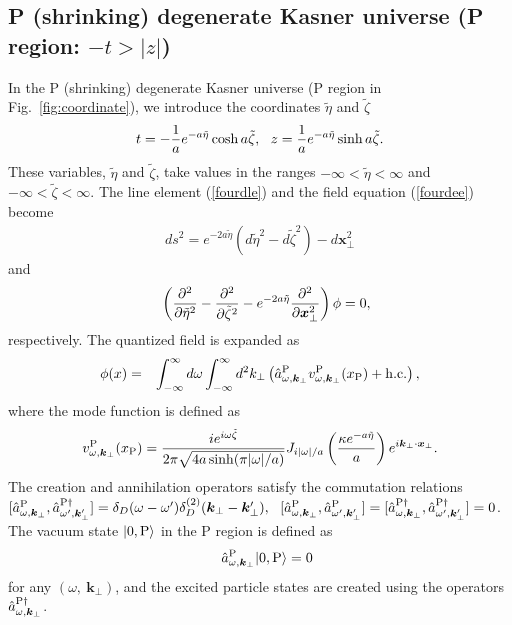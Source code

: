 \documentclass[aps,prd,preprintnumbers,nofootinbib,showpacs,11pt]{revtex4}%
\begin{document}
\begin{widetext}
\subsection{P (shrinking) degenerate Kasner universe (P region: $-t>|z|$)}
In the P (shrinking) degenerate Kasner universe (P region in Fig.~\ref{fig:coordinate}),
we introduce the coordinates $\tilde\eta$ and $\tilde\zeta$ 
\begin{eqnarray}
t=-{1\over a}e^{-a\tilde\eta}\cosh a\tilde\zeta,~~
z={1\over a}e^{-a\tilde\eta}\sinh a\tilde\zeta.
\end{eqnarray}
These variables, $\tilde\eta$ and $\tilde\zeta$, take values in the ranges $-\infty<\tilde\eta<\infty$ and 
$-\infty<\tilde\zeta<\infty$. The line element (\ref{fourdle}) and
the field equation (\ref{fourdee}) become
\begin{eqnarray}
ds^2=e^{-2a\tilde\eta}(d\tilde\eta^2-d\tilde \zeta^2)-d\bm x_\perp^2
\end{eqnarray}
and 
\begin{eqnarray}
&&\left({\partial^2\over \partial \tilde\eta^2}-{\partial^2\over \partial \tilde\zeta^2}
-e^{-2a\tilde\eta}{\partial^2\over \partial \bm x_\perp^2}\right)\phi=0,
\label{fourdeP}
\end{eqnarray}
respectively. The quantized field is expanded as
\begin{eqnarray}
  \phi(x) &=&\int_{-\infty}^{\infty} d \omega\int_{-\infty}^{\infty} d^2 k_\perp \left( {\hat a}_{\omega,{\bm k}_\perp}^\P
  v_{\omega,{\bm k}_\perp}^\P(x_\P)
+{\rm h.c.}
\right),
\label{qfP}
\end{eqnarray}
where the mode function is defined as
\begin{eqnarray}
v_{\omega,{\bm k}_\perp}^\P(x_\P)={ie^{i\omega \tilde\zeta}\over 2\pi\sqrt{4a\sinh (\pi |\omega|/a)}}
J_{i|\omega|/a}\left({\kappa e^{-a\tilde\eta}\over a}\right)
e^{i\bm k_\perp\cdot \bm x_\perp}.
\label{qfPP}
\end{eqnarray}
The creation and annihilation operators satisfy the commutation relations
$[{\hat a}^{\rm P}_{\omega,\bm k_\perp}, {\hat a}_{\omega',\bm k_\perp'}^{{\rm P}\dagger}]
=\delta_D(\omega-\omega') \delta_D^{(2)}(\bm k_\perp-\bm k_\perp'), 
~~
[{\hat a}^{\rm P}_{\omega,\bm k_\perp}, {\hat a}_{\omega',\bm k_\perp'}^{\rm P}]
=[{\hat a}^{{\rm P}\dagger}_{\omega,\bm k_\perp}, {\hat a}_{\omega',\bm k_\perp'}^{{\rm P}\dagger}]
=0$. 
The vacuum state $|0,{\rm P}\rangle$ in the P region is defined as 
\begin{eqnarray}
&&
\hat a_{\omega,\bm k_\perp}^\P|0,{\rm P}\rangle=0
\label{fourdPvauum}
\end{eqnarray}
for any $(\omega,~\bm k_\perp)$, and the excited particle states are created 
using the operators $\hat a_{\omega,\bm k_\perp}^{{\rm P}\dagger}$. 


\end{widetext}
\end{document}
